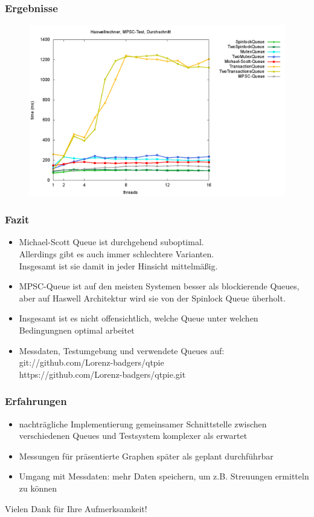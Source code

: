 \documentclass[svgnames]{beamer}
\begin{document}
\begin{frame}
\frametitle{Ergebnisse}
\begin {figure}
      \begin{center}
	\includegraphics[width=\textwidth]{fastboxsa.png}
     \end{center}
\end {figure}
\end{frame}



\begin{frame}
\frametitle{Fazit}
\begin{itemize}
\item Michael-Scott Queue ist durchgehend suboptimal.\\
	Allerdings gibt es auch immer schlechtere Varianten.\\
	Insgesamt ist sie damit in jeder Hinsicht mittelm\"a\ss{}ig.
\item MPSC-Queue ist auf den meisten Systemen besser als blockierende Queues,
	aber auf Haswell Architektur wird sie von der Spinlock Queue \"uberholt.
\item Insgesamt ist es nicht offensichtlich, welche Queue unter welchen Bedingungnen optimal arbeitet
\item Messdaten, Testumgebung und verwendete Queues auf:\\
	git://github.com/Lorenz-badgers/qtpie \\
	https://github.com/Lorenz-badgers/qtpie.git
\end{itemize}
\end{frame}


\begin{frame}
\frametitle{Erfahrungen}
\begin{itemize}
\item nachtr\"agliche Implementierung gemeinsamer Schnittstelle zwischen verschiedenen Queues und Testsystem komplexer als erwartet
\item Messungen f\"ur pr\"asentierte Graphen sp\"ater als geplant durchf\"uhrbar
\item Umgang mit Messdaten: mehr Daten speichern, um z.B. Streuungen ermitteln zu k\"onnen
\end{itemize}
\end{frame}



\begin{frame}
\Large{\centerline{Vielen Dank f\"ur Ihre Aufmerksamkeit!}}
\end{frame}
\end{document}
